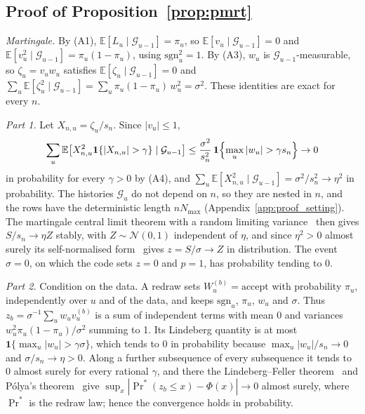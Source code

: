 \subsection{Proof of Proposition~\ref{prop:pmrt}}
\label{app:proof_prop}

\emph{Martingale.} By (A1), $\mathbb{E}[L_u \mid \mathcal{G}_{u-1}] = \pi_u$, so
$\mathbb{E}[v_u \mid \mathcal{G}_{u-1}] = 0$ and
$\mathbb{E}[v_u^2 \mid \mathcal{G}_{u-1}] = \pi_u (1 - \pi_u)$, using
$\mathrm{sgn}_u^2 = 1$. By (A3), $w_u$ is $\mathcal{G}_{u-1}$-measurable, so
$\zeta_u = v_u w_u$ satisfies $\mathbb{E}[\zeta_u \mid \mathcal{G}_{u-1}] = 0$ and
$\sum_u \mathbb{E}[\zeta_u^2 \mid \mathcal{G}_{u-1}] = \sum_u \pi_u (1 - \pi_u)\, w_u^2 = \sigma^2$.
These identities are exact for every $n$.

\emph{Part 1.} Let $X_{n,u} = \zeta_u / s_n$. Since $|v_u| \le 1$,
\begin{equation*}
\sum_u \mathbb{E}\bigl[X_{n,u}^2 \mathbf{1}\{|X_{n,u}| > \gamma\} \mid \mathcal{G}_{u-1}\bigr]
\le \frac{\sigma^2}{s_n^2}\, \mathbf{1}\Bigl\{\max_u |w_u| > \gamma s_n\Bigr\} \to 0
\end{equation*}
in probability for every $\gamma > 0$ by (A4), and
$\sum_u \mathbb{E}[X_{n,u}^2 \mid \mathcal{G}_{u-1}] = \sigma^2 / s_n^2 \to \eta^2$ in probability.
The histories $\mathcal{G}_u$ do not depend on $n$, so they are nested in $n$, and the rows have the
deterministic length $n N_{\max}$ (Appendix~\ref{app:proof_setting}). The martingale central limit theorem with a random
limiting variance~\cite[Cor.~3.1]{hall1980martingale} then gives $S / s_n \to \eta Z$ stably, with
$Z \sim \mathcal{N}(0, 1)$ independent of $\eta$, and since $\eta^2 > 0$ almost surely its self-normalised
form~\cite[Cor.~3.2]{hall1980martingale} gives $z = S / \sigma \to Z$ in distribution. The event $\sigma = 0$, on which the code
sets $z = 0$ and $p = 1$, has probability tending to 0.

\emph{Part 2.} Condition on the data. A redraw sets $W_u^{(b)} = \text{accept}$ with probability
$\pi_u$, independently over $u$ and of the data, and keeps $\mathrm{sgn}_u$, $\pi_u$, $w_u$ and
$\sigma$. Thus $z_b = \sigma^{-1} \sum_u w_u v_u^{(b)}$ is a sum of independent terms with
mean 0 and variances $w_u^2 \pi_u (1 - \pi_u) / \sigma^2$ summing to 1. Its Lindeberg
quantity is at most $\mathbf{1}\{\max_u |w_u| > \gamma \sigma\}$, which tends to 0 in
probability because $\max_u |w_u| / s_n \to 0$ and $\sigma / s_n \to \eta > 0$. Along a further subsequence of every subsequence it tends to 0 almost surely for every
rational $\gamma$, and there the Lindeberg--Feller theorem~\cite[Thm.~3.4.10]{durrett2019probability} and
P\'olya's theorem~\cite[Exercise~3.2.9]{durrett2019probability} give $\sup_x |\Pr^*(z_b \le x) - \Phi(x)| \to 0$
almost surely, where $\Pr^*$ is the redraw law; hence the convergence holds in probability.


